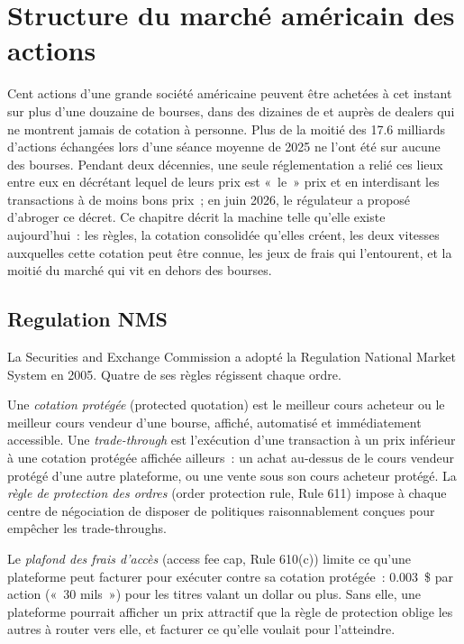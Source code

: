 \chapter{Structure du marché américain des actions}\label{ch:m1:us-equity-market-structure}

Cent actions d'une grande société américaine peuvent être achetées à cet instant
sur plus d'une douzaine de bourses, dans des dizaines de  et
auprès de dealers qui ne montrent jamais de cotation à personne. Plus de la moitié des
17.6 milliards d'actions échangées lors d'une séance moyenne de 2025 ne l'ont été
sur aucune des bourses. Pendant deux décennies, une seule réglementation a relié ces
lieux entre eux en décrétant lequel de leurs prix est «~le~» prix et en interdisant
les transactions à de moins bons prix~; en juin 2026, le régulateur a proposé d'abroger
ce décret. Ce chapitre décrit la machine telle qu'elle existe aujourd'hui~: les
règles, la cotation consolidée qu'elles créent, les deux vitesses auxquelles cette
cotation peut être connue, les jeux de frais qui l'entourent, et la moitié du
marché qui vit en dehors des bourses.

\section{Regulation NMS}

La Securities and Exchange Commission a adopté la Regulation National Market
System en 2005. Quatre de ses règles régissent chaque ordre.

\begin{definition}\label{def:m1:us-equity-market-structure:opr}
Une \emph{cotation protégée} (protected quotation) est le meilleur cours acheteur ou le
meilleur cours vendeur d'une bourse, affiché, automatisé et immédiatement accessible. Une
\emph{trade-through} est l'exécution d'une transaction à un
prix inférieur à une cotation protégée affichée ailleurs~: un achat au-dessus de
le cours vendeur protégé d'une autre plateforme, ou une vente sous son cours acheteur protégé. La
\emph{règle de protection des ordres} (order protection rule, Rule 611) impose à
chaque centre de négociation de disposer de politiques raisonnablement conçues pour
empêcher les trade-throughs.
\end{definition}

\begin{definition}\label{def:m1:us-equity-market-structure:cap}
Le \emph{plafond des frais d'accès} (access fee cap, Rule 610(c)) limite ce qu'une
plateforme peut facturer pour exécuter contre sa cotation protégée~: 0.003~\$ par
action («~30 mils~») pour les titres valant un dollar ou plus. Sans elle, une
plateforme pourrait afficher un prix attractif que la règle de protection oblige les autres
à router vers elle, et facturer ce qu'elle voulait pour l'atteindre.
\end{definition}

